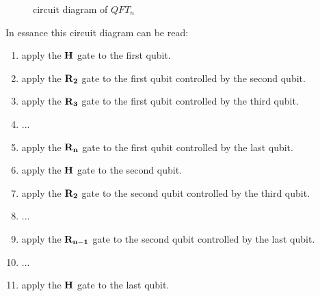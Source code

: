 \begin{figure}[H]
{
    }
    \caption{circuit diagram of $QFT_n$}
    \label{fig:QTF_n}
\end{figure}
In essance this circuit diagram can be read:
\begin{enumerate}
    \item apply the $\mathbf{H}$ gate to the first qubit. 
    \item apply the $\mathbf{R_{2}}$ gate to the first qubit controlled by the second qubit. 
    \item apply the $\mathbf{R_{3}}$ gate to the first qubit controlled by the third qubit. 
    \item ... 
    \item apply the $\mathbf{R_{n}}$ gate to the first qubit controlled by the last qubit. 
    \item apply the $\mathbf{H}$ gate to the second qubit. 
    \item apply the $\mathbf{R_{2}}$ gate to the second qubit controlled by the third qubit. 
    \item ... 
    \item apply the $\mathbf{R_{n-1}}$ gate to the second qubit controlled by the last qubit. 
    \item ... 
    \item apply the $\mathbf{H}$ gate to the last qubit. 
\end{enumerate}
